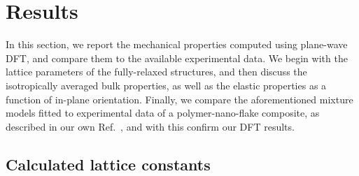\section{Results}
\label{sec:mechanical_results}

In this section, 
we report the mechanical properties 
computed using plane-wave DFT, 
and compare them to the 
available experimental data.
%
We begin with the lattice parameters 
of the fully-relaxed structures, 
and then discuss 
the isotropically averaged bulk properties, 
as well as the elastic properties as a function of 
in-plane orientation.
%
Finally, we compare the 
aforementioned mixture models 
fitted to experimental data 
of a polymer-nano-flake composite, 
as described in our own Ref.~\cite{PMID:26469634}, 
and with this confirm our DFT results.

\subsection{Calculated lattice constants}
\label{sec:lattice_constants}

